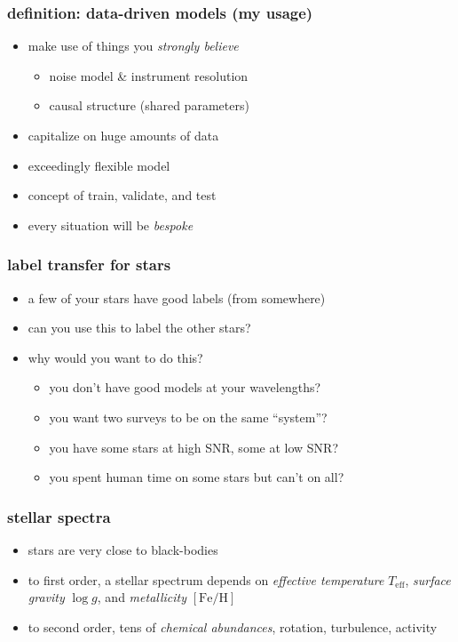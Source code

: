 \documentclass[pdftex]{beamer}
\newcommand{\teff}{T_{\mathrm{eff}}}
\newcommand{\logg}{\log g}
\newcommand{\feh}{[\mathrm{Fe / H}]}
\begin{document}
\begin{frame}
  \frametitle{definition: data-driven models (my usage)}
  \begin{itemize}
  \item make use of things you \emph{strongly believe}
    \begin{itemize}
    \item noise model \& instrument resolution
    \item causal structure (shared parameters)
    \end{itemize}
  \item capitalize on huge amounts of data
  \item exceedingly flexible model
  \item concept of train, validate, and test
  \item every situation will be \emph{bespoke}
  \end{itemize}
\end{frame}

\begin{frame}
  \frametitle{label transfer for stars}
  \begin{itemize}
  \item a few of your stars have good labels (from somewhere)
  \item can you use this to label the other stars?
  \item why would you want to do this?
    \begin{itemize}
    \item<2> you don't have good models at your wavelengths?
    \item<2> you want two surveys to be on the same ``system''?
    \item<2> you have some stars at high SNR, some at low SNR?
    \item<2> you spent human time on some stars but can't on all?
    \end{itemize}
  \end{itemize}
\end{frame}

\begin{frame}
  \frametitle{stellar spectra}
  \begin{itemize}
  \item<1-> stars are very close to black-bodies
  \item<1-> to first order, a stellar spectrum depends on \emph{effective temperature} $\teff$, \emph{surface gravity} $\logg$, and \emph{metallicity} $\feh$
  \item<2> to second order, tens of \emph{chemical abundances}, rotation, turbulence, activity
  \end{itemize}
\end{frame}
\end{document}
